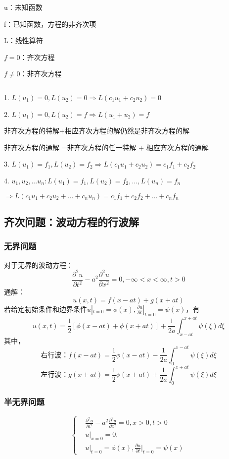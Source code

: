 u：未知函数

f：已知函数，方程的非齐次项

L：线性算符

$f=0$：齐次方程

$f\neq0$：非齐次方程
\begin{thm}[解的叠加原理]$\ $

    1. $L(u_1)=0,L(u_2)=0\Rightarrow L(c_1u_1+c_2u_2)=0$

    2. $L(u_1)=0,L(u_2)=f\Rightarrow L(u_1+u_2)=f$

    非齐次方程的特解+相应齐次方程的解仍然是非齐次方程的解

    非齐次方程的通解 =非齐次方程的任一特解 + 相应齐次方程的通解

    3. $L(u_1)=f_1,L(u_2)=f_2\Rightarrow L(c_1u_1+c_2u_2)=c_1f_1+c_2f_2$

    4. $u_1,u_2,...u_n: L(u_1)=f_1, L(u_2)=f_2,...,L(u_n)=f_n$
    
    $\Rightarrow L(c_1u_1+c_2u_2+...+c_nu_n)=c_1f_1+c_2f_2+...+c_nf_n$
\end{thm}


\subsection{齐次问题：波动方程的行波解}
\subsubsection{无界问题}
对于无界的波动方程：
$$\frac{\partial^2{u}}{\partial{t}^2}-a^2\frac{\partial^2{u}}{\partial{x}^2}=0, -\infty<x<\infty, t>0$$ 
通解：
$$\boxed{u(x,t)=f(x-at)+g(x+at)}$$
若给定初始条件和边界条件$u|_{t=0}=\phi(x),\frac{\partial u}{\partial t}|_{t=0}=\psi(x)$，有
$$u(x,t)=\frac{1}{2}[\phi(x-at)+\phi(x+at)]+\frac{1}{2a}\int^{x+at}_{x-at}\psi(\xi)d\xi$$
其中，
$$\mbox{右行波：}f(x-at)=\frac{1}{2}\phi(x-at)-\frac{1}{2a}\int^{x-at}_{0}\psi(\xi)d\xi$$
$$\mbox{左行波：}g(x+at)=\frac{1}{2}\phi(x+at)+\frac{1}{2a}\int^{x+at}_{0}\psi(\xi)d\xi$$

\subsubsection{半无界问题}
$$\left\{
    \begin{aligned}
            &\frac{\partial^2{u}}{\partial{t}^2}-a^2\frac{\partial^2{u}}{\partial{x}^2}=0,x>0, t>0\\
&u|_{x=0}=0,\\
            &u|_{t=0}=\phi(x),\frac{\partial u}{\partial t}\bigg|_{t=0}=\psi(x)
    \end{aligned}
\right.$$

